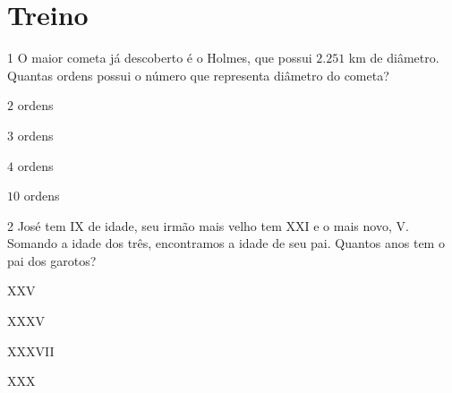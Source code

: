 \section{Treino}

\num{1}  O maior cometa já descoberto é o Holmes, que possui $2.251$ km de
diâmetro. Quantas ordens possui o número que representa diâmetro do cometa?

\begin{escolha}
\item $2$ ordens
\item $3$ ordens
\item $4$ ordens
\item $10$ ordens
\end{escolha}





\num{2}  José tem IX de idade, seu irmão mais velho tem XXI e o mais novo, V.
Somando a idade dos três, encontramos a idade de seu pai. Quantos anos
tem o pai dos garotos?

\begin{escolha}
\item XXV
\item XXXV
\item XXXVII
\item XXX
\end{escolha}



